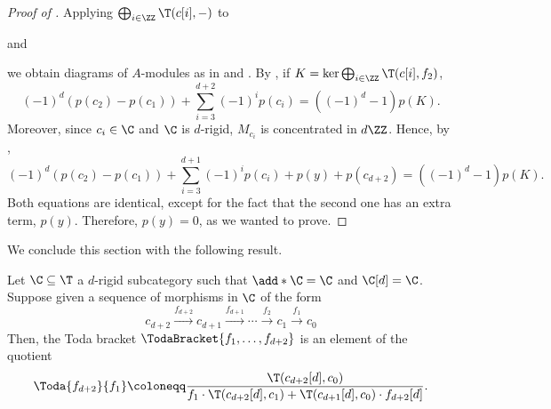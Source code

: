 \documentclass[a4paper]{amsart}
\begin{document}
\begin{proof}[Proof of ]
  Applying $\bigoplus_{i\in\ZZ}\T(c[i],-)$ to 
  \begin{center}
  \end{center}
  and
  \begin{center}
  \end{center}
  we obtain diagrams of $A$-modules as in  and . By , if $K=\ker\bigoplus_{i\in\ZZ}\T(c[i],f_2)$, 
  \[(-1)^d\left(p(c_2)-p(c_1)\right)+\sum_{i=3}^{d+2}(-1)^ip(c_i)=\left((-1)^d-1\right)p(K).\]
  Moreover, since $c_i\in\C$ and $\C$ is $d$-rigid, $M_{c_i}$ is concentrated in $d\ZZ$. Hence, by ,
  \[(-1)^d\left(p(c_2)-p(c_1)\right)+\sum_{i=3}^{d+1}(-1)^ip(c_i)+p(y)+p(c_{d+2})=\left((-1)^d-1\right)p(K).\]
  Both equations are identical, except for the fact that the second one has an extra term, $p(y)$. Therefore, $p(y)=0$, as we wanted to prove.
\end{proof}

We conclude this section with the following result.

\begin{proposition}
  \label{defprop:TodaBracket_indeterminacy}
  Let $\C\subseteq\T$ a $d$-rigid subcategory such that $\add*{\C}=\C$ and
  $\C[d]=\C$. Suppose given a sequence of morphisms in $\C$ of the form
  \[
    c_{d+2}\xrightarrow{f_{d+2}}c_{d+1}\xrightarrow{f_{d+1}}\cdots\xrightarrow{f_2}c_1\xrightarrow{f_1}c_0
  \]
  Then, the Toda bracket $\TodaBracket{f_1,\dots,f_{d+2}}$ is an element of the
  quotient
  \[
    \Toda{f_{d+2}}{f_1}\coloneqq
    \frac{\T(c_{d+2}[d],c_0)}{f_1\cdot\T(c_{d+2}[d],c_1)+\T(c_{d+1}[d],c_0)\cdot
      f_{d+2}[d]}.
  \]
\end{proposition}
\end{document}
